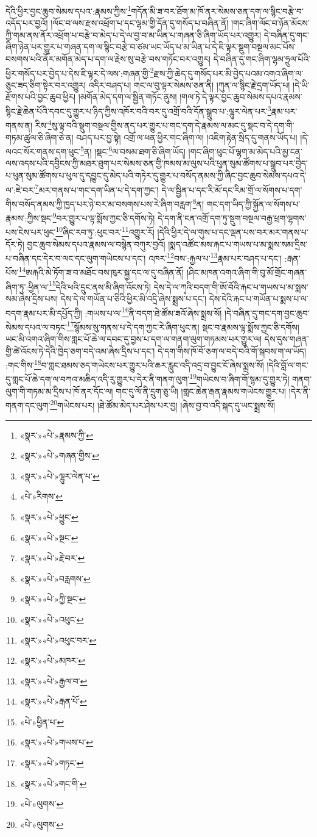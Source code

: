 དེའི་ཕྱིར་བྱང་ཆུབ་སེམས་དཔའ་:རྣམས་ཀྱིས་\footnote{«སྣར་»«པེ་»རྣམས་ཀྱི་}གདོན་མི་ཟ་བར་ཐོག་མ་ཁོ་ནར་སེམས་ཅན་དག་ལ་སྙིང་བརྩེ་བ་འདོད་པར་བྱའོ། །ལོང་བ་ལས་རྫས་འཕྲོག་པ་དང་ལྷམ་གྱི་དོན་དུ་གསོད་པ་བཞིན་ནོ། །གང་ཞིག་ལོང་བ་ཉོན་མོངས་ཀྱི་གམ་ནས་ནོར་འཕྲོག་པ་བརྩེ་བ་མེད་པ་དེ་ལ་བྱ་བ་མ་ཡིན་པ་གཞན་ཅི་ཞིག་ཡོད་པར་འགྱུར། དེ་བཞིན་དུ་གང་ཞིག་ཉེན་པར་གྱུར་པ་གཞན་དག་ལ་སྙིང་བརྩེ་བ་ཙམ་ཡང་ཡོད་པ་མ་ཡིན་པ་དེ་ཇི་ལྟར་སྡུག་བསྔལ་མང་པོས་བསགས་པའི་ནོར་མགོན་མེད་པ་དག་ལ་རྗེས་སུ་བརྩེ་བས་གཏོང་བར་འགྱུར། དེ་བཞིན་དུ་གང་ཞིག་ལྷམ་ཧྲུལ་པོའི་ཕྱིར་གསོད་པར་བྱེད་པ་དེས་ཇི་ལྟར་དེ་ལས་:གཞན་གྱི་\footnote{«སྣར་»«པེ་»གཞན་གྱིས་}རྫས་ཀྱི་ཆེད་དུ་གསོད་པར་མི་བྱེད་པའམ་འགའ་ཞིག་ལ་ཅུང་ཟད་ཅིག་སྟེར་བར་འགྱུར། འདིར་བཤད་པ། གང་ལ་བུ་ལྟར་སེམས་ཅན་ནི། །ཀུན་ལ་སྙིང་རྗེ་དྲག་ཡོད་པ། །དེ་ཡི་རྫོགས་པའི་བྱང་ཆུབ་ཕྱིར། །མགོན་མེད་དག་ལ་སྦྱིན་གཏོང་ནུས། །གལ་ཏེ་དེ་ལྟར་བྱང་ཆུབ་སེམས་དཔའ་རྣམས་སྙིང་རྗེ་ཆེན་པོའི་དབང་དུ་གྱུར་པ་ཉིད་ཀྱིས་འཁོར་བའི་བར་དུ་འགྲོ་བའི་དོན་སྒྲུབ་པ་:ལྷུར་ལེན་པར་\footnote{«སྣར་»«པེ་»ལྷུར་ལེན་པ་}རྣམ་པར་གནས་ན། རིས་\footnote{«པེ་»རིགས་}སུ་ལྟ་བའི་སྡུག་བསྔལ་གྱིས་ནད་པར་གྱུར་པ་གང་དག་དེ་རྣམས་ལ་མང་དུ་སྡང་བ་དེ་དག་གི་གཏམ་ཚུལ་ཅི་ཞིག་ཅེ་ན། བཤད་པར་བྱ་སྟེ། འགྲོ་ལ་ཕན་ཕྱིར་གང་ཞིག་ལ། །འཇིག་རྟེན་སྲིད་དུ་གནས་ཡོད་པ། །དེ་ལའང་སོར་གནས་དག་ཕུང་\footnote{«སྣར་»«པེ་»ཕྱུང་}ན། །སྡང་\footnote{«སྣར་»«པེ་»སྔང་}ལ་བསམ་ཐག་ཅི་ཞིག་ཡོད། །གང་ཞིག་ཕུང་པོ་ལྷག་མ་མེད་པའི་མྱ་ངན་ལས་འདས་པའི་དབྱིངས་ཀྱི་མཐར་ཐུག་པར་སེམས་ཅན་གྱི་ཁམས་མ་ལུས་པའི་ཕུན་སུམ་ཚོགས་པ་སྒྲུབ་པར་བྱེད་པ་ཕུན་སུམ་ཚོགས་པ་ཕུལ་དུ་དབྱུང་དུ་མེད་པའི་གཏེར་དུ་གྱུར་པ་བསོད་ནམས་ཀྱི་ཞིང་བྱང་ཆུབ་སེམས་དཔའ་དེ་ལ་:ཇེ་བར་\footnote{«སྣར་»«པེ་»རྗེ་བར་}མར་གནས་པ་གང་དག་ཡིན་པ་དེ་དག་ཀྱང་། དེ་ལ་སྦྱིན་པ་དང་རི་མོ་དང་རིམ་གྲོ་ལ་སོགས་པ་དག་གིས་བསོད་ནམས་ཀྱི་ཁྱད་པར་ཉེ་བར་མ་བསགས་པས་རེ་ཞིག་བརླག་\footnote{«སྣར་»«པེ་»བརླགས་}ན། གང་དག་ཡིད་ཀྱི་སྐྱོན་ལ་སོགས་པ་རྣམས་:ཀྱིས་སྡང་\footnote{«སྣར་»«པེ་»ཀྱི་སྔང་}བར་གྱུར་པ་ལྟ་སྨོས་ཀྱང་ཅི་དགོས་ཏེ། དེ་དག་ནི་ངན་འགྲོ་དག་ཏུ་སྡུག་བསྔལ་བརྒྱ་ཕྲག་ལྷགས་པས་ངེས་པར་ཕུང་\footnote{«སྣར་»«པེ་»འཕུང་}ཞིང་རབ་ཏུ་:ཕུང་བར་\footnote{«སྣར་»«པེ་»འཕུང་བར་}འགྱུར་རོ། །དེའི་ཕྱིར་དེ་ལ་གུས་པ་དང་ལྡན་པས་བར་མར་གནས་པ་དོར་ཏེ། བྱང་ཆུབ་སེམས་དཔའ་རྣམས་ལ་བསྙེན་བཀུར་བྱའོ། །སྨད་འཚོང་མས་རྐང་པ་གཡས་པ་མ་སྨས་སམ་དྲིས་པ་བཞིན་དང་དེར་བ་ལང་དང་ལུག་གཡེངས་པ་དང་། འཁར་\footnote{«སྣར་»«པེ་»མཁར་}བས་:རྐྱལ་པ་\footnote{«སྣར་»«པེ་»རྒྱལ་བ་}རྣམ་པར་བཤད་པ་དང་། :རྒན་པོས་\footnote{«སྣར་»«པེ་»རྒན་པོ་}ཨརྐའི་མེ་ཏོག་ཟ་བ་མཐོང་བས་ཁུར་སྐྱ་དང་ལ་དུ་བཞིན་ནོ། །ཤིང་མཁན་འགའ་ཞིག་གི་བུ་མོ་གྲོང་གཞན་ཞིག་ཏུ་:ཕྱིན་ལ་\footnote{«པེ་»ཕྱིན་པ་}དེའི་ཕའི་དྲུང་ནས་མི་ཞིག་འོངས་ཏེ། དེས་དེ་ལ་ཀྭའི་བདག་གི་ཨོ་བོའི་རྐང་པ་གཡས་པ་མ་སྨས་སམ་ཞེས་དྲིས་པས། དེས་དེ་ལ་གཡོན་པ་ཅིའི་ཕྱིར་མི་འདྲི་ཞེས་སྨྲས་པ་དང་། དེས་དེའི་རྐང་པ་གཡོན་པ་སྨས་པ་ལ་བདག་རྣམ་པར་མི་དཔྱོད་ཀྱི། :གཡས་པ་ལ་\footnote{«སྣར་»«པེ་»གཡས་པ་}ནི་བདག་ཐེ་ཚོམ་ཟའོ་ཞེས་སྨྲས་སོ། །དེ་བཞིན་དུ་གང་དག་བྱང་ཆུབ་སེམས་དཔའ་ལ་བཏང་\footnote{«སྣར་»«པེ་»གཏང་}སྙོམས་སུ་གནས་པ་དེ་དག་ཀྱང་རེ་ཞིག་ཕུང་ན། སྡང་བ་རྣམས་ལྟ་སྨོས་ཀྱང་ཅི་དགོས། ཡང་མི་འགའ་ཞིག་གིས་གླང་པོ་ཆེ་ལ་དབང་དུ་བྱས་པ་དག་ལ་གནག་ལུག་གཏམས་པར་གྱུར་ལ། དེས་དུས་གཞན་གྱི་ཚེ་འོངས་ཏེ་དེའི་ཁྱེད་ཅག་བདེ་འམ་ཞེས་དྲིས་པ་དང་། དེ་དག་གིས་ཁོ་བོ་ཅག་ལ་བདེ་བའི་གོ་སྐབས་ག་ལ་ཡོད། :གང་གིས་\footnote{«སྣར་»«པེ་»གང་གི་}བ་གླང་ཐམས་ཅད་གཡེངས་པར་གྱུར་པའི་ཆར་རླུང་འདི་འདྲ་བ་བྱུང་ངོ་ཞེས་སྨྲས་སོ། །དེའི་བློ་ལ་གང་དུ་གླང་པོ་ཆེ་དག་ལ་བཀའ་མཆིད་འདི་རུ་གྱུར་པ་དེར་ནི་གནག་ལུག་\footnote{«པེ་»ལུགས་}གཡེངས་བ་ཞིག་གོ་སྙམ་དུ་གྱུར་ཏེ། གནག་ལུག་གི་གཏམ་མ་དྲིས་པ་ཁོ་ནར་དོང་ལ། གང་དུ་ལོ་ནི་དྲུག་ཅུ་ཡི། །གླང་ཆེན་རྒན་རྣམས་གཡེངས་གྱུར་པ། །དེར་ནི་གནག་དང་ལུག་\footnote{«པེ་»ལུགས་}གཡེངས་པར། །ཐེ་ཚོམ་མེད་པར་ཤེས་པར་བྱ། །ཞེས་བྱ་བ་འདི་སྐད་དུ་ཡང་སྨྲས་སོ། 